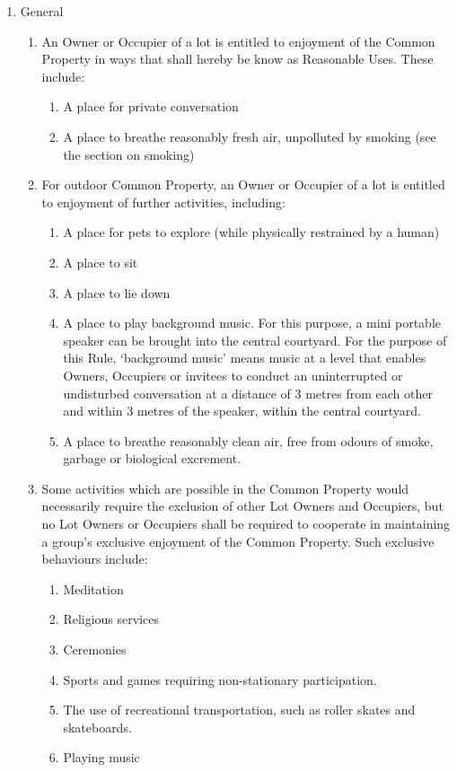 \documentclass{article}
\begin{document}
\begin{enumerate}[label=\arabic*.]
\begin{enumerate}[label=\arabic{enumi}.\arabic*.]

\item  General

\begin{enumerate}[label=(\arabic*)]

\item An Owner or Occupier of a lot is entitled to enjoyment of the Common Property in ways that shall hereby be know as Reasonable Uses. These include:
\begin{enumerate}[label=(\alph*)]
    \item A place for private conversation
    \item A place to breathe reasonably fresh air, unpolluted by smoking (see the section on smoking)

\end{enumerate}
\item For outdoor Common Property, an Owner or Occupier of a lot is entitled to enjoyment of further activities, including:
\begin{enumerate}[label=(\alph*)]
    \item A place for pets to explore (while physically restrained by a human)
    \item A place to sit
    \item A place to lie down
    \item A place to play background music. For this purpose, a mini portable speaker can be brought into the central courtyard. For the purpose of this Rule, ‘background music’ means music at a level that enables Owners, Occupiers or invitees to conduct an uninterrupted or undisturbed conversation at a distance of 3 metres from each other and within 3 metres of the speaker, within the central courtyard.
    \item A place to breathe reasonably clean air, free from odours of smoke, garbage or biological excrement.
\end{enumerate}
\item Some activities which are possible in the Common Property would necessarily require the exclusion of other Lot Owners and Occupiers, but no Lot Owners or Occupiers shall be required to cooperate in maintaining a group's exclusive enjoyment of the Common Property. Such exclusive behaviours include:
\begin{enumerate}[label=(\alph*)]
    \item Meditation
    \item Religious services
    \item Ceremonies
    \item Sports and games requiring non-stationary participation.
    \item The use of recreational transportation, such as roller skates and skateboards.
    \item Playing music
\end{enumerate}


\end{enumerate}
\end{enumerate}
\end{enumerate}
\end{document}
